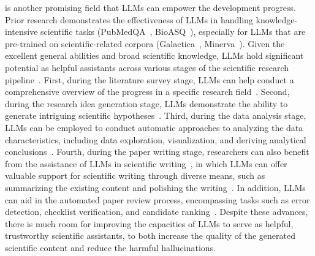 { is another 
promising field that LLMs can empower the development progress. %
Prior research demonstrates the effectiveness of LLMs in handling knowledge-intensive scientific tasks (\eg PubMedQA~\cite{Jin-emnlp-2019-PubMedQA}, BioASQ~\cite{Anastasia-blog-2022-BioASQ}), especially for LLMs that are pre-trained on scientific-related corpora (\eg Galactica~\cite{Taylor-arxiv-2022-Galactica}, Minerva~\cite{Lewkowycz-arxiv-2022-Solving}).
Given the excellent general abilities and broad scientific knowledge, LLMs hold significant potential as helpful assistants across various stages of the scientific research pipeline~\cite{Zhang-arxiv-2023-One}. 
First, during the literature survey stage, LLMs can help conduct a comprehensive overview of the  progress in a specific research  field~\cite{Haman-2023-air-Using,Aydn-2022-ssrn-OpenAI}.
Second, during the research idea generation stage, LLMs demonstrate the ability to generate intriguing scientific hypotheses~\cite{Part-2023-arxiv-Can}.
Third, during the data analysis stage, LLMs can be employed to conduct automatic approaches to analyzing the data characteristics,  including data exploration, visualization, and deriving analytical conclusions~\cite{Hasaan-2023-arxiv-ChatGPT,Cheng-2023-arxiv-Is}.
Fourth, during the paper writing stage,  researchers can also benefit from the assistance of LLMs in scientific writing~\cite{Alkaissi-pubmed-2023-Artificial,Azaria-2023-arxiv-ChatGPT}, in which  {LLMs can offer valuable support for scientific writing through diverse means, such as summarizing the existing  content and polishing the writing~\cite{Buruk-2023-arxiv-Academic}. } 
In addition, LLMs can aid in the automated paper review process, encompassing tasks such as error detection, checklist verification, and candidate ranking~\cite{Liu-2023-arxiv-ReviewerGPT}.
Despite these advances, 
there is much room for improving the capacities of LLMs to serve as helpful, trustworthy scientific assistants, to both increase the quality of the generated scientific content  and reduce the harmful hallucinations. 
%

}

